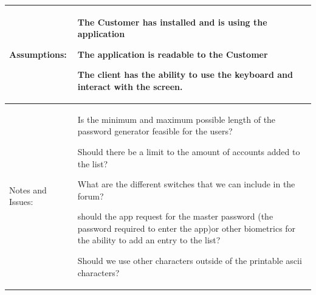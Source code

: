 \documentclass[stu]{apa7}
\newcommand{\nextitem}{\par\hspace*{\labelsep}\textbullet\hspace*{\labelsep}}
\begin{document}
{\begin{xltabular}{\textwidth}{|l|X|}
   Assumptions: & \nextitem The Customer has installed and is using the application
     \nextitem The application is readable to the Customer
     \nextitem The client has the ability to use the keyboard and interact with the screen. \\ \hline

   Notes and Issues: & \nextitem Is the minimum and maximum possible length of the password generator feasible for the users?
     \nextitem Should there be a limit to the amount of accounts added to the list?
     \nextitem What are the different switches that we can include in the forum?
     \nextitem should the app request for the master password (the password required to enter the app)or other biometrics for the ability to add an entry to the list?
     \nextitem Should we use other characters outside of the printable ascii characters? \\ \hline
\end{xltabular}}

\pagebreak
\end{document}
